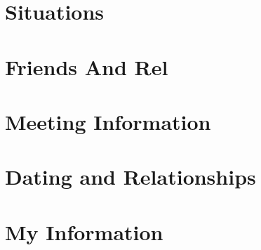 \documentclass[]{beamer}
\begin{document}

\section{Situations}



\section{Friends And Rel}


\section{Meeting Information}

\section{Dating and Relationships}

\section{My Information} 
%

\begin{markdown} %
\end{markdown}
\end{document}
